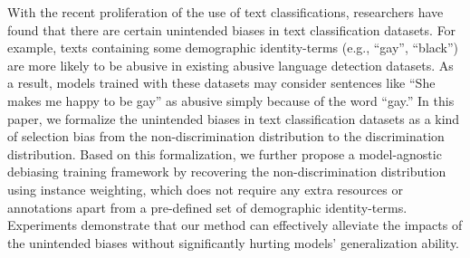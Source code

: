 With the recent proliferation of the use of text classifications, researchers have found that there are certain unintended biases in text classification datasets. For example, texts containing some demographic identity-terms (e.g., ``gay'', ``black'') are more likely to be abusive in existing abusive language detection datasets. As a result, models trained with these datasets may consider sentences like ``She makes me happy to be gay'' as abusive simply because of the word ``gay.'' In this paper, we formalize the unintended biases in text classification datasets as a kind of selection bias from the non-discrimination distribution to the discrimination distribution. Based on this formalization, we further propose a model-agnostic debiasing training framework by recovering the non-discrimination distribution using instance weighting, which does not require any extra resources or annotations apart from a pre-defined set of demographic identity-terms. Experiments demonstrate that our method can effectively alleviate the impacts of the unintended biases without significantly hurting models' generalization ability.
